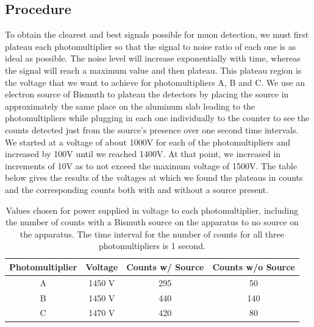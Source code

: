 \subsection{Procedure}
\indent \indent To obtain the clearest and best signals possible for muon detection, we must first plateau each photomultiplier so that the signal to noise ratio of each one is as ideal as possible. The noise level will increase exponentially with time, whereas the signal will reach a maximum value and then plateau. This plateau region is the voltage that we want to achieve for photomultipliers A, B and C. We use an electron source of Bismuth to plateau the detectors by placing the source in approximately the same place on the aluminum slab leading to the photomultipliers while plugging in each one individually to the counter to see the counts detected just from the source's presence over one second time intervals. We started at a voltage of about 1000V for each of the photomultipliers and increased by 100V until we reached 1400V. At that point, we increased in increments of 10V as to not exceed the maximum voltage of 1500V. The table below gives the results of the voltages at which we found the plateaus in counts and the corresponding counts both with and without a source present. 
\begin{table}[h]
\begin{center}
\begin{tabular}{|c|c|c|c|} \hline
Photomultiplier & Voltage & Counts w/ Source & Counts w/o Source \\ \hline
A & 1450 V & 295 & 50 \\ \hline
B & 1450 V & 440 & 140 \\ \hline
C & 1470 V & 420 & 80\\ \hline

\end{tabular}
\caption{Values chosen for power supplied in voltage to each photomultiplier, including the number of counts with a Bismuth source on the apparatus to no source on the apparatus. The time interval for the number of counts for all three photomultipliers is 1 second.}
\end{center}
\end{table}

